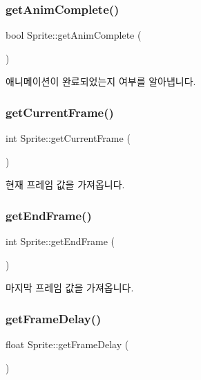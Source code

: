 \subsubsection{\texorpdfstring{getAnimComplete()}{getAnimComplete()}}
{\footnotesize\ttfamily bool Sprite\+::get\+Anim\+Complete (\begin{DoxyParamCaption}{ }\end{DoxyParamCaption})}

애니메이션이 완료되었는지 여부를 알아냅니다. \mbox{\label{class_sprite_a278f32183edd6a9efb095ae3f102e50f}} 
\subsubsection{\texorpdfstring{getCurrentFrame()}{getCurrentFrame()}}
{\footnotesize\ttfamily int Sprite\+::get\+Current\+Frame (\begin{DoxyParamCaption}{ }\end{DoxyParamCaption})}

현재 프레임 값을 가져옵니다. \mbox{\label{class_sprite_a2d6fcef649708d0b82a441f5412d73ec}} 
\subsubsection{\texorpdfstring{getEndFrame()}{getEndFrame()}}
{\footnotesize\ttfamily int Sprite\+::get\+End\+Frame (\begin{DoxyParamCaption}{ }\end{DoxyParamCaption})}

마지막 프레임 값을 가져옵니다. \mbox{\label{class_sprite_ae94abbbeb05f4a166ba96f6fa9f31ddc}} 
\subsubsection{\texorpdfstring{getFrameDelay()}{getFrameDelay()}}
{\footnotesize\ttfamily float Sprite\+::get\+Frame\+Delay (\begin{DoxyParamCaption}{ }\end{DoxyParamCaption})}

